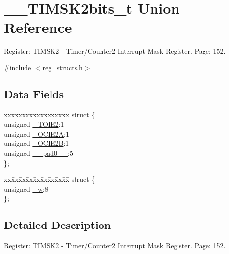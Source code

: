 \hypertarget{union_____t_i_m_s_k2bits__t}{\section{\+\_\+\+\_\+\+T\+I\+M\+S\+K2bits\+\_\+t Union Reference}
\label{union_____t_i_m_s_k2bits__t}
}


Register\+: T\+I\+M\+S\+K2 -\/ Timer/\+Counter2 Interrupt Mask Register. Page\+: 152.  




{\ttfamily \#include $<$reg\+\_\+structs.\+h$>$}

\subsection*{Data Fields}
\begin{DoxyCompactItemize}
\item 
\begin{tabbing}
xx\=xx\=xx\=xx\=xx\=xx\=xx\=xx\=xx\=\kill
struct \{\\
\>unsigned \hyperlink{union_____t_i_m_s_k2bits__t_a8ca920f458312e651cf1e4fdb5b3f035}{\_TOIE2}:1\\
\>unsigned \hyperlink{union_____t_i_m_s_k2bits__t_a706c0a8f768fcc9d22972e9ce4106453}{\_OCIE2A}:1\\
\>unsigned \hyperlink{union_____t_i_m_s_k2bits__t_a01be8ad50ce3d572237ac5e3a2931306}{\_OCIE2B}:1\\
\>unsigned \hyperlink{union_____t_i_m_s_k2bits__t_a4871294780ace1b7f44fea277918c74c}{\_\_pad0\_\_}:5\\
\}; \\

\end{tabbing}\item 
\begin{tabbing}
xx\=xx\=xx\=xx\=xx\=xx\=xx\=xx\=xx\=\kill
struct \{\\
\>unsigned \hyperlink{union_____t_i_m_s_k2bits__t_a21475061ea38cb2095683e843fa70029}{\_w}:8\\
\}; \\

\end{tabbing}\end{DoxyCompactItemize}


\subsection{Detailed Description}
Register\+: T\+I\+M\+S\+K2 -\/ Timer/\+Counter2 Interrupt Mask Register. Page\+: 152. 

